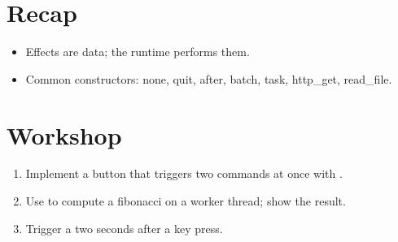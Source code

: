 \section{Recap}

\begin{recap}
\begin{itemize}[leftmargin=*]
  \item Effects are data; the runtime performs them.
  \item Common constructors: none, quit, after, batch, task,
    http\_get, read\_file.
\end{itemize}
\end{recap}

\section*{Workshop}

\begin{enumerate}[leftmargin=*]
  \item Implement a button that triggers two commands at
    once with .
  \item Use  to compute a fibonacci on a worker
    thread; show the result.
  \item Trigger a  two seconds after a key press.
\end{enumerate}
